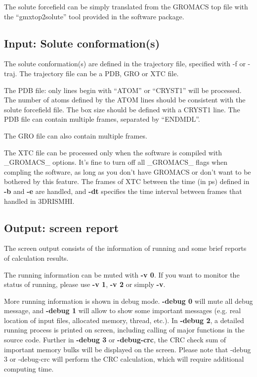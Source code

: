 \documentclass[aip,amsmath,amssymb,reprint,onecolumn]{revtex4-1}
\begin{document}
The solute forcefield can be simply translated from the GROMACS top file with the ``gmxtop2solute'' tool provided in the software package.


\subsection{Input: Solute conformation(s)}\label{sec:io.traj}

The solute conformation(s) are defined in the trajectory file, specified with -f or -traj. The trajectory file can be a PDB, GRO or XTC file.

The PDB file: only lines begin with ``ATOM'' or ``CRYST1'' will be processed. The number of atoms defined by the ATOM lines should be consistent with the solute forcefield file. The box size should be defined with a CRYST1 line. The PDB file can contain multiple frames, separated by ``ENDMDL''.

The GRO file can also contain multiple frames.

The XTC file can be processed only when the software is compiled with \_GROMACS\_ options. It's fine to turn off all \_GROMACS\_ flags when compling the software, as long as you don't have GROMACS or don't want to be bothered by this feature. The frames of XTC between the time (in ps) defined in {\bf -b} and {\bf -e} are handled, and {\bf -dt} specifies the time interval between frames that handled in 3DRISMHI.


\subsection{Output: screen report}\label{sec:io.screen}

The screen output consists of the information of running and some brief reports of calculation results.

The running information can be muted with {\bf -v 0}. If you want to monitor the status of running, please use {\bf -v 1}, {\bf -v 2} or simply {\bf -v}.

More running information is shown in debug mode. {\bf -debug 0} will mute all debug message, and {\bf -debug 1} will allow to show some important messages (e.g. real location of input files, allocated memory, thread, etc.). In {\bf -debug 2}, a detailed running process is printed on screen, including calling of major functions in the source code. Further in {\bf -debug 3} or {\bf -debug-crc}, the CRC check sum of important memory bulks will be displayed on the screen. Please note that -debug 3 or -debug-crc will perform the CRC calculation, which will require additional computing time.
\end{document}
